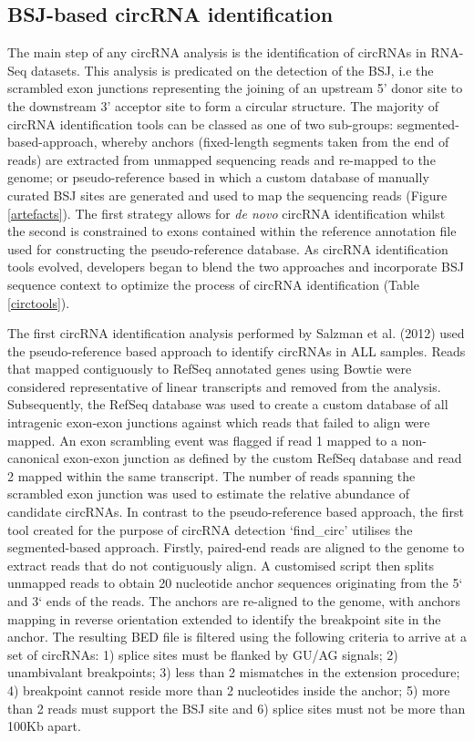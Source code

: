 \documentclass[pdflatex,sn-mathphys-num]{sn-jnl}
\begin{document}
\subsection{BSJ-based circRNA identification}
The main step of any circRNA analysis is the identification of circRNAs in RNA-Seq datasets. This analysis is predicated on the detection of the BSJ, i.e the scrambled exon junctions representing the joining of an upstream 5' donor site to the downstream 3' acceptor site to form a circular structure. The majority of circRNA identification tools can be classed as one of two sub-groups: segmented-based-approach, whereby anchors (fixed-length segments taken from the end of reads) are extracted from unmapped sequencing reads and re-mapped to the genome; or pseudo-reference based in which a custom database of manually curated BSJ sites are generated and used to map the sequencing reads (Figure \ref{artefacts}). The first strategy allows for \textit{de novo} circRNA identification whilst the second is constrained to exons contained within the reference annotation file used for constructing the pseudo-reference database. As circRNA identification tools evolved, developers began to blend the two approaches and incorporate BSJ sequence context to optimize the process of circRNA identification (Table \ref{circtools}). \par
The first circRNA identification analysis performed by Salzman et al. (2012) \cite{Salzman2012} used the pseudo-reference based approach to identify circRNAs in ALL samples. Reads that mapped contiguously to RefSeq annotated genes using Bowtie \cite{Bowtie} were considered representative of linear transcripts and removed from the analysis. Subsequently, the RefSeq database was used to create a custom database of all intragenic exon-exon junctions against which reads that failed to align were mapped. An exon scrambling event was flagged if read 1 mapped to a non-canonical exon-exon junction as defined by the custom RefSeq database and read 2 mapped within the same transcript. The number of reads spanning the scrambled exon junction was used to estimate the relative abundance of candidate circRNAs. In contrast to the pseudo-reference based approach, the first tool created for the purpose of circRNA detection `find\_circ' \cite{find_circ} utilises the segmented-based approach. Firstly, paired-end reads are aligned to the genome to extract reads that do not contiguously align. A customised script then splits unmapped reads to obtain 20 nucleotide anchor sequences originating from the 5` and 3` ends of the reads. The anchors are re-aligned to the genome, with anchors mapping in reverse orientation extended to identify the breakpoint site in the anchor. The resulting BED file is filtered using the following criteria to arrive at a set of circRNAs: 1) splice sites must be flanked by GU/AG signals; 2) unambivalant breakpoints; 3) less than 2 mismatches in the extension procedure; 4) breakpoint cannot reside more than 2 nucleotides inside the anchor; 5) more than 2 reads must support the BSJ site and 6) splice sites must not be more than 100Kb apart. \par
\end{document}
